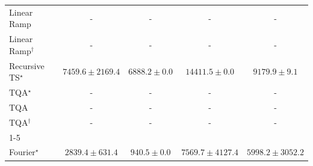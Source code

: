 \begin{tabular}{l|cccc|}
Linear Ramp & {\cellcolor[HTML]{000000}} \color[HTML]{F1F1F1} {\cellcolor{white}} \color{black} - & {\cellcolor[HTML]{000000}} \color[HTML]{F1F1F1} {\cellcolor{white}} \color{black} - & {\cellcolor[HTML]{000000}} \color[HTML]{F1F1F1} {\cellcolor{white}} \color{black} - & {\cellcolor[HTML]{000000}} \color[HTML]{F1F1F1} {\cellcolor{white}} \color{black} - \\
Linear Ramp$^\dagger$ & {\cellcolor[HTML]{000000}} \color[HTML]{F1F1F1} {\cellcolor{white}} \color{black} - & {\cellcolor[HTML]{000000}} \color[HTML]{F1F1F1} {\cellcolor{white}} \color{black} - & {\cellcolor[HTML]{000000}} \color[HTML]{F1F1F1} {\cellcolor{white}} \color{black} - & {\cellcolor[HTML]{000000}} \color[HTML]{F1F1F1} {\cellcolor{white}} \color{black} - \\
Recursive TS$^\star$ & {\cellcolor[HTML]{FEFFE2}} \color[HTML]{000000} $7459.6\pm 2169.4$ & {\cellcolor[HTML]{FFFFE5}} \color[HTML]{000000} $6888.2\pm 0.0$ & {\cellcolor[HTML]{F1FAB5}} \color[HTML]{000000} $14411.5\pm 0.0$ & {\cellcolor[HTML]{FCFED6}} \color[HTML]{000000} $9179.9\pm 9.1$ \\
TQA$^\star$ & {\cellcolor[HTML]{000000}} \color[HTML]{F1F1F1} {\cellcolor{white}} \color{black} - & {\cellcolor[HTML]{000000}} \color[HTML]{F1F1F1} {\cellcolor{white}} \color{black} - & {\cellcolor[HTML]{000000}} \color[HTML]{F1F1F1} {\cellcolor{white}} \color{black} - & {\cellcolor[HTML]{000000}} \color[HTML]{F1F1F1} {\cellcolor{white}} \color{black} - \\
TQA & {\cellcolor[HTML]{000000}} \color[HTML]{F1F1F1} {\cellcolor{white}} \color{black} - & {\cellcolor[HTML]{000000}} \color[HTML]{F1F1F1} {\cellcolor{white}} \color{black} - & {\cellcolor[HTML]{000000}} \color[HTML]{F1F1F1} {\cellcolor{white}} \color{black} - & {\cellcolor[HTML]{000000}} \color[HTML]{F1F1F1} {\cellcolor{white}} \color{black} - \\
TQA$^\dagger$ & {\cellcolor[HTML]{000000}} \color[HTML]{F1F1F1} {\cellcolor{white}} \color{black} - & {\cellcolor[HTML]{000000}} \color[HTML]{F1F1F1} {\cellcolor{white}} \color{black} - & {\cellcolor[HTML]{000000}} \color[HTML]{F1F1F1} {\cellcolor{white}} \color{black} - & {\cellcolor[HTML]{000000}} \color[HTML]{F1F1F1} {\cellcolor{white}} \color{black} - \\
\cline{1-5}
\multicolumn{5}{c}{\rule{0pt}{8pt}SV} \\
\midrule
Fourier$^\star$ & {\cellcolor[HTML]{C4CBE3}} \color[HTML]{000000} $2839.4\pm 631.4$ & {\cellcolor[HTML]{FFF7FB}} \color[HTML]{000000} $940.5\pm 0.0$ & {\cellcolor[HTML]{023858}} \color[HTML]{F1F1F1} $7569.7\pm 4127.4$ & {\cellcolor[HTML]{056DAC}} \color[HTML]{F1F1F1} $5998.2\pm 3052.2$ \\

\end{tabular}

